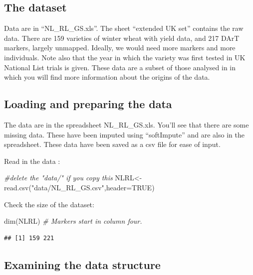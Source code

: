 \documentclass[
]{book}
\newenvironment{Shaded}{\begin{snugshade}}{\end{snugshade}}
\newcommand{\AttributeTok}[1]{\textcolor[rgb]{0.77,0.63,0.00}{#1}}
\newcommand{\CommentTok}[1]{\textcolor[rgb]{0.56,0.35,0.01}{\textit{#1}}}
\newcommand{\ConstantTok}[1]{\textcolor[rgb]{0.00,0.00,0.00}{#1}}
\newcommand{\FunctionTok}[1]{\textcolor[rgb]{0.00,0.00,0.00}{#1}}
\newcommand{\NormalTok}[1]{#1}
\newcommand{\OtherTok}[1]{\textcolor[rgb]{0.56,0.35,0.01}{#1}}
\newcommand{\StringTok}[1]{\textcolor[rgb]{0.31,0.60,0.02}{#1}}
\begin{document}
\hypertarget{the-dataset}{%
\subsection{The dataset}\label{the-dataset}}

Data are in ``NL\_RL\_GS.xls''. The sheet ``extended UK set'' contains the raw data. There are 159
varieties of winter wheat with yield data, and 217 DArT markers, largely unmapped. Ideally,
we would need more markers and more individuals. Note also that the year in which the
variety was first tested in UK National List trials is given. These data are a subset of those analysed in \citet{Mackay2011} in which you will find more information about the origins of the data.

\hypertarget{loading-and-preparing-the-data}{%
\subsection{Loading and preparing the data}\label{loading-and-preparing-the-data}}

The data are in the spreadsheet NL\_RL\_GS.xls. You'll see that there are some missing data.
These have been imputed using ``softImpute'' and are also in the spreadsheet. These data have been saved as a csv file for ease of input.

Read in the data :

\begin{Shaded}
\begin{Highlighting}[]
\CommentTok{\#delete the "data/" if you copy this}
\NormalTok{NLRL}\OtherTok{\textless{}{-}}\FunctionTok{read.csv}\NormalTok{(}\StringTok{"data/NL\_RL\_GS.csv"}\NormalTok{,}\AttributeTok{header=}\ConstantTok{TRUE}\NormalTok{)}
\end{Highlighting}
\end{Shaded}

Check the size of the dataset:

\begin{Shaded}
\begin{Highlighting}[]
\FunctionTok{dim}\NormalTok{(NLRL) }\CommentTok{\# Markers start in column four.}
\end{Highlighting}
\end{Shaded}

\begin{verbatim}
## [1] 159 221
\end{verbatim}

\hypertarget{examining-the-data-structure}{%
\subsection{Examining the data structure}\label{examining-the-data-structure}}
\end{document}
